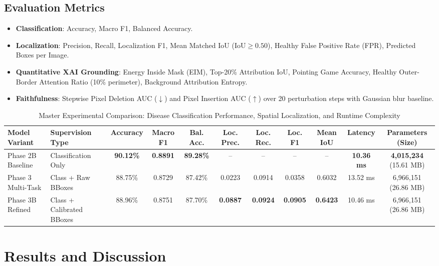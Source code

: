 \documentclass[conference]{IEEEtran}
\begin{document}
\subsection{Evaluation Metrics}
\begin{itemize}
    \item \textbf{Classification}: Accuracy, Macro F1, Balanced Accuracy.
    \item \textbf{Localization}: Precision, Recall, Localization F1, Mean Matched IoU ($\text{IoU} \ge 0.50$), Healthy False Positive Rate (FPR), Predicted Boxes per Image.
    \item \textbf{Quantitative XAI Grounding}: Energy Inside Mask (EIM), Top-20\% Attribution IoU, Pointing Game Accuracy, Healthy Outer-Border Attention Ratio (10\% perimeter), Background Attribution Entropy.
    \item \textbf{Faithfulness}: Stepwise Pixel Deletion AUC ($\downarrow$) and Pixel Insertion AUC ($\uparrow$) over 20 perturbation steps with Gaussian blur baseline.
\end{itemize}

\begin{table}[t]
\centering
\caption{Master Experimental Comparison: Disease Classification Performance, Spatial Localization, and Runtime Complexity}
\label{tab:main_model_comparison}
\scriptsize
\setlength{\tabcolsep}{4.0pt}
\begin{tabular}{llccccccccc}
\toprule
\textbf{Model Variant} & \textbf{Supervision Type} & \textbf{Accuracy} & \textbf{Macro F1} & \textbf{Bal. Acc.} & \textbf{Loc. Prec.} & \textbf{Loc. Rec.} & \textbf{Loc. F1} & \textbf{Mean IoU} & \textbf{Latency} & \textbf{Parameters (Size)} \\
\midrule
Phase 2B Baseline & Classification Only & \textbf{90.12\%} & \textbf{0.8891} & \textbf{89.28\%} & -- & -- & -- & -- & \textbf{10.36 ms} & \textbf{4,015,234} (15.61 MB) \\
Phase 3 Multi-Task & Class + Raw BBoxes & 88.75\% & 0.8729 & 87.42\% & 0.0223 & 0.0914 & 0.0358 & 0.6032 & 13.52 ms & 6,966,151 (26.86 MB) \\
Phase 3B Refined & Class + Calibrated BBoxes & 88.96\% & 0.8751 & 87.70\% & \textbf{0.0887} & \textbf{0.0924} & \textbf{0.0905} & \textbf{0.6423} & 10.46 ms & 6,966,151 (26.86 MB) \\
\bottomrule
\end{tabular}
\end{table}

\section{Results and Discussion}
\label{sec:results}
\end{document}
